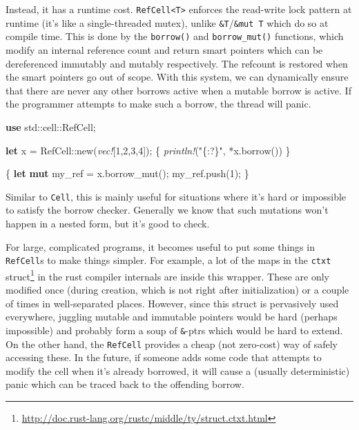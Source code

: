 \documentclass[a4paper,]{book}
\newenvironment{Shaded}{\begin{snugshade}}{\end{snugshade}}
\newcommand{\KeywordTok}[1]{\textcolor[rgb]{0.13,0.29,0.53}{\textbf{{#1}}}}
\newcommand{\DecValTok}[1]{\textcolor[rgb]{0.00,0.00,0.81}{{#1}}}
\newcommand{\StringTok}[1]{\textcolor[rgb]{0.31,0.60,0.02}{{#1}}}
\newcommand{\PreprocessorTok}[1]{\textcolor[rgb]{0.56,0.35,0.01}{\textit{{#1}}}}
\newcommand{\NormalTok}[1]{{#1}}
\renewcommand{\href}[2]{#2\footnote{\url{#1}}}
\begin{document}
Instead, it has a runtime cost.
\texttt{RefCell\textless{}T\textgreater{}} enforces the read-write lock
pattern at runtime (it's like a single-threaded mutex), unlike
\texttt{\&T}/\texttt{\&mut\ T} which do so at compile time. This is done
by the \texttt{borrow()} and \texttt{borrow\_mut()} functions, which
modify an internal reference count and return smart pointers which can
be dereferenced immutably and mutably respectively. The refcount is
restored when the smart pointers go out of scope. With this system, we
can dynamically ensure that there are never any other borrows active
when a mutable borrow is active. If the programmer attempts to make such
a borrow, the thread will panic.

\begin{Shaded}
\begin{Highlighting}[]
\KeywordTok{use} \NormalTok{std::cell::RefCell;}

\KeywordTok{let} \NormalTok{x = RefCell::new(}\PreprocessorTok{vec!}\NormalTok{[}\DecValTok{1}\NormalTok{,}\DecValTok{2}\NormalTok{,}\DecValTok{3}\NormalTok{,}\DecValTok{4}\NormalTok{]);}
\NormalTok{\{}
    \PreprocessorTok{println!}\NormalTok{(}\StringTok{"\{:?\}"}\NormalTok{, *x.borrow())}
\NormalTok{\}}

\NormalTok{\{}
    \KeywordTok{let} \KeywordTok{mut} \NormalTok{my_ref = x.borrow_mut();}
    \NormalTok{my_ref.push(}\DecValTok{1}\NormalTok{);}
\NormalTok{\}}
\end{Highlighting}
\end{Shaded}

Similar to \texttt{Cell}, this is mainly useful for situations where
it's hard or impossible to satisfy the borrow checker. Generally we know
that such mutations won't happen in a nested form, but it's good to
check.

For large, complicated programs, it becomes useful to put some things in
\texttt{RefCell}s to make things simpler. For example, a lot of the maps
in \href{http://doc.rust-lang.org/rustc/middle/ty/struct.ctxt.html}{the
\texttt{ctxt} struct} in the rust compiler internals are inside this
wrapper. These are only modified once (during creation, which is not
right after initialization) or a couple of times in well-separated
places. However, since this struct is pervasively used everywhere,
juggling mutable and immutable pointers would be hard (perhaps
impossible) and probably form a soup of \texttt{\&}-ptrs which would be
hard to extend. On the other hand, the \texttt{RefCell} provides a cheap
(not zero-cost) way of safely accessing these. In the future, if someone
adds some code that attempts to modify the cell when it's already
borrowed, it will cause a (usually deterministic) panic which can be
traced back to the offending borrow.
\end{document}
